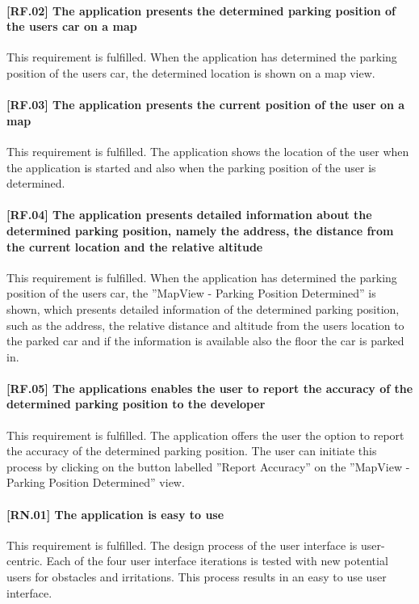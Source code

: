 \paragraph{[RF.02] The application presents the determined parking position of the users car on a map}
This requirement is fulfilled. When the application has determined the parking position of the users car, the determined location is shown on a map view.

\paragraph{[RF.03] The application presents the current position of the user on a map}
This requirement is fulfilled. The application shows the location of the user when the application is started and also when the parking position of the user is determined.

\paragraph{[RF.04] The application presents detailed information about the determined parking position, namely the address, the distance from the current location and the relative altitude}
This requirement is fulfilled. When the application has determined the parking position of the users car, the ''MapView - Parking Position Determined'' is shown, which presents detailed information of the determined parking position, such as the address, the relative distance and altitude from the users location to the parked car and if the information is available also the floor the car is parked in.

\paragraph{[RF.05] The applications enables the user to report the accuracy of the determined parking position to the developer}
This requirement is fulfilled. The application offers the user the option to report the accuracy of the determined parking position. The user can initiate this process by clicking on the button labelled ''Report Accuracy'' on the ''MapView - Parking Position Determined'' view.


\paragraph{[RN.01] The application is easy to use}
This requirement is fulfilled. The design process of the user interface is user-centric. Each of the four user interface iterations is tested with new potential users for obstacles and irritations. This process results in an easy to use user interface.

